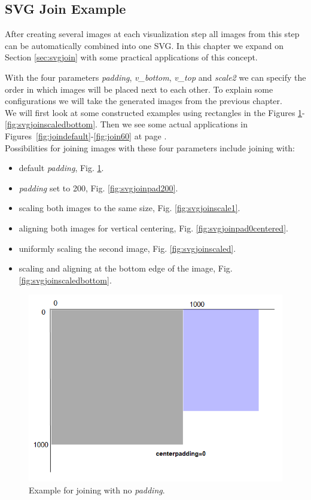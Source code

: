 \documentclass[a4paper, 12pt, bibliography=totoc]{scrartcl}
\begin{document}
\subsection{SVG Join Example}

After creating several images at each visualization step all images from this step can be automatically combined into one SVG. In this chapter we expand on Section \ref{sec:svgjoin} with some practical applications of this concept.

With the four parameters \textit{padding}, \textit{v\_bottom}, \textit{v\_top} and \textit{scale2} we can specify the order in which images will be placed next to each other. To explain some configurations we will take the generated images from the previous chapter.\\
\noindent
We will first look at some constructed examples using rectangles in the Figures \ref{fig:svgjoinpad0}-\ref{fig:svgjoinscaledbottom}. Then we see some actual applications in Figures~\ref{fig:joindefault}-\ref{fig:join60} at page \pageref{fig:joindefault}.\noindent\\

\medskip\noindent
Possibilities for joining images with these four parameters include joining with:
\begin{itemize}[label=-, left=40pt]
	\item default \textit{padding}, Fig. \ref{fig:svgjoinpad0}.
	\item \textit{padding} set to 200, Fig. \ref{fig:svgjoinpad200}.
	\item scaling both images to the same size, Fig. \ref{fig:svgjoinscale1}.
	\item aligning both images for vertical centering, Fig. \ref{fig:svgjoinpad0centered}.
	\item uniformly scaling the second image, Fig. \ref{fig:svgjoinscaled}.
	\item scaling and aligning at the bottom edge of the image, Fig. \ref{fig:svgjoinscaledbottom}.
\end{itemize}

\begin{figure}[H]
	\centering
	\includegraphics[width=0.6\linewidth]{images/svgjoinpad0.png}
	\caption{Example for joining with no \textit{padding}.}
	\label{fig:svgjoinpad0}
\end{figure}
\end{document}
